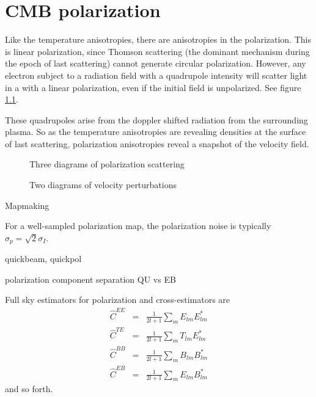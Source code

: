 \chapter{CMB polarization}

Like the temperature anisotropies, there are anisotropies in the polarization.  This is linear polarization, since Thomson scattering (the dominant mechanism during the epoch of last scattering) cannot generate circular polarization.  However, any electron subject to a radiation field with a quadrupole intensity will scatter light in a with a linear polarization, even if the initial field is unpolarized.  See figure \ref{fig:pol_in_thomson_scattering}.

These quadrupoles arise from the doppler shifted radiation from the surrounding plasma.  So as the temperature anisotropies are revealing densities at the surface of last scattering, polarization anisotropies reveal a snapshot of the velocity field.

\begin{figure}
  \fakeplot
  \caption{Three diagrams of polarization scattering}\label{fig:pol_in_thomson_scattering}
\end{figure}

\begin{figure}
  \fakeplot
  \caption{Two diagrams of velocity perturbations} \label{fig:velocity_doppler_quadrupoles}
\end{figure}

Mapmaking

For a well-sampled polarization map, the polarization noise is typically $\sigma_p = \sqrt{2} \sigma_I$.

quickbeam, quickpol \citep{2017A&A...598A..25H}

polarization component separation
QU vs EB

Full sky estimators for polarization and cross-estimators are
\begin{eqnarray}
  \hat C^{EE} &=& \frac{1}{2l+1} \sum_m E_{lm} E_{lm}^* \\ \nonumber
  \hat C^{TE} &=& \frac{1}{2l+1} \sum_m T_{lm} E_{lm}^* \\ \nonumber
  \hat C^{BB} &=& \frac{1}{2l+1} \sum_m B_{lm} B_{lm}^* \\ \nonumber
  \hat C^{EB} &=& \frac{1}{2l+1} \sum_m E_{lm} B_{lm}^*
\end{eqnarray}
and so forth.

